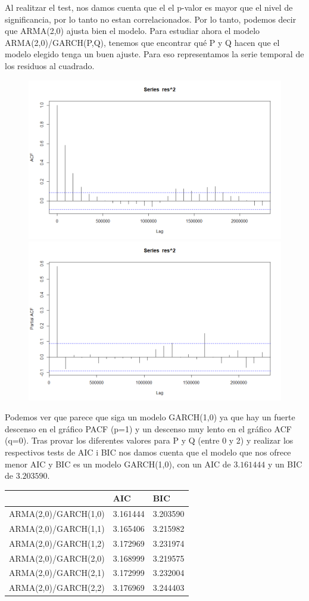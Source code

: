 \documentclass[a4paper,]{article}
\begin{document}
Al realitzar el test, nos damos cuenta que el el p-valor es mayor que el nivel de significancia, por lo tanto no estan correlacionados. Por lo tanto, podemos decir que ARMA(2,0) ajusta bien el modelo. Para estudiar ahora el modelo ARMA(2,0)/GARCH(P,Q), tenemos que encontrar qué P y Q hacen que el modelo elegido tenga un buen ajuste. Para eso representamos la serie temporal de los residuos al cuadrado.

\begin{figure}[H]
    \centering \includegraphics[width=0.49\linewidth]{ACF-Res^2.png}
    \includegraphics[width=0.49\linewidth]{PACF-Res^2.png}
\end{figure}

Podemos ver que parece que siga un modelo GARCH(1,0) ya que hay un fuerte descenso en el gráfico PACF (p=1) y un descenso muy lento en el gráfico ACF (q=0). Tras provar los diferentes valores para P y Q (entre 0 y 2) y realizar los respectivos tests de AIC i BIC nos damos cuenta que el modelo que nos ofrece menor AIC y BIC es un modelo GARCH(1,0), con un AIC de $3.161444$ y un BIC de $3.203590$.

\begin{table}[]
\centering
\begin{tabular}{|l|l|l|}
\hline
                     & AIC      & BIC      \\ \hline
ARMA(2,0)/GARCH(1,0) & 3.161444 & 3.203590 \\ \hline
ARMA(2,0)/GARCH(1,1) & 3.165406 & 3.215982 \\ \hline
ARMA(2,0)/GARCH(1,2) & 3.172969 & 3.231974 \\ \hline
ARMA(2,0)/GARCH(2,0) & 3.168999 & 3.219575 \\ \hline
ARMA(2,0)/GARCH(2,1) & 3.172999 & 3.232004 \\ \hline
ARMA(2,0)/GARCH(2,2) & 3.176969 & 3.244403 \\ \hline
\end{tabular}
\end{table}
\end{document}
